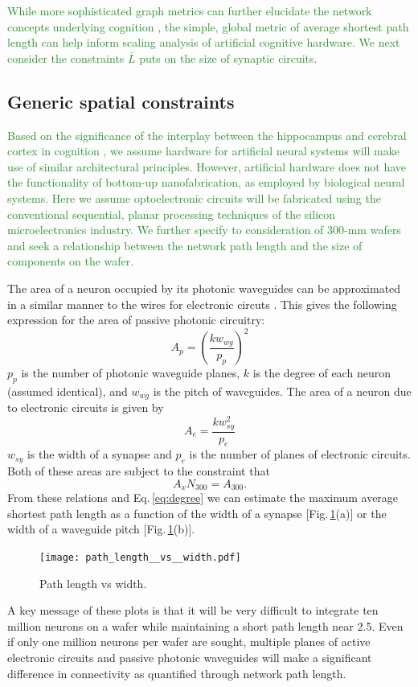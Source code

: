 \documentclass[twocolumn]{article}
\begin{document}
\textcolor{ForestGreen}{While more sophisticated graph metrics can further elucidate the network concepts underlying cognition \cite{busp2009,sp2010}, the simple, global metric of average shortest path length can help inform scaling analysis of artificial cognitive hardware. We next consider the constraints $\bar{L}$ puts on the size of synaptic circuits.}

\subsection{Generic spatial constraints}
\label{sec:spatial_constraints}
\textcolor{ForestGreen}{Based on the significance of the interplay between the hippocampus and cerebral cortex in cognition \cite{frbu2016}, we assume hardware for artificial neural systems will make use of similar architectural principles. However, artificial hardware does not have the functionality of bottom-up nanofabrication, as employed by biological neural systems. Here we assume optoelectronic circuits will be fabricated using the conventional sequential, planar processing techniques of the silicon microelectronics industry. We further specify to consideration of 300-mm wafers and seek a relationship between the network path length and the size of components on the wafer.}

The area of a neuron occupied by its photonic waveguides can be approximated in a similar manner to the wires for electronic circuts \cite{ke1982}. This gives the following expression for the area of passive photonic circuitry:
\begin{equation}
\label{eq:area_p}
A_p = \left( \frac{k w_{wg}}{p_p} \right)^2
\end{equation}
$p_p$ is the number of photonic waveguide planes, $k$ is the degree of each neuron (assumed identical), and $w_{wg}$ is the pitch of waveguides. The area of a neuron due to electronic circuits is given by
\begin{equation}
\label{eq:area_e}
A_e = \frac{k w_{sy}^2}{p_e}
\end{equation}
$w_{sy}$ is the width of a synapse and $p_e$ is the number of planes of electronic circuits. Both of these areas are subject to the constraint that
\begin{equation}
\label{eq:area_x}
A_x N_{300} = A_{300}.
\end{equation}
From these relations and Eq.\,\ref{eq:degree} we can estimate the maximum average shortest path length as a function of the width of a synapse [Fig.\,\ref{fig:path_length__vs__width}(a)] or the width of a waveguide pitch [Fig.\,\ref{fig:path_length__vs__width}(b)]. 
\begin{figure}
    \centering
    \texttt{[image: path\_length\_\_vs\_\_width.pdf]}
    \caption{Path length vs width.}
    \label{fig:path_length__vs__width}
\end{figure}
A key message of these plots is that it will be very difficult to integrate ten million neurons on a wafer while maintaining a short path length near 2.5. Even if only one million neurons per wafer are sought, multiple planes of active electronic circuits and passive photonic waveguides will make a significant difference in connectivity as quantified through network path length.
\end{document}
